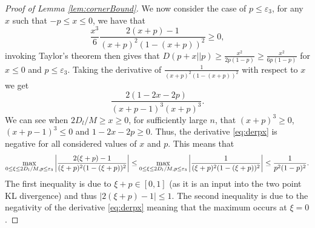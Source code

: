 \documentclass[12pt,reqno]{amsart}
\numberwithin{equation}{section}
\theoremstyle{definition}
\renewcommand{\epsilon}{\varepsilon}
\renewcommand{\[}{\begin{equation}}
\renewcommand{\]}{\end{equation}}
\renewcommand{\|}{\bigg{|}}
\begin{document}
\begin{proof}[Proof of Lemma \ref{lem:cornerBound}]
        We now consider the case of $p \leq \epsilon_3$, for any $x$ such that $-p \leq x \leq 0$, we have that
        \[\frac{x^3}{6}\frac{2(x+p)-1}{(x+p)^2(1-(x+p))^2} \geq 0,\]
        invoking Taylor's theorem then gives that $D(p+x||p) \geq \frac{x^2}{2p(1-p)}  \geq \frac{x^2}{6p(1-p)}$ for $x \leq 0$ and $p \leq \epsilon_3$. Taking the derivative of $\frac{1}{(x+p)^2(1-(x+p))^2}$ with respect to $x$ we get 
        \[\frac{2(1- 2x - 2p)}{(x + p - 1)^3(x + p)^3}.\label{eq:derpx}\]
        We can see when $2D_l/M \geq x \geq 0$, for sufficiently large $n$, that $(x + p)^3 \geq 0$, $(x + p - 1)^3 \leq 0$ and $1-2x-2p \geq 0$. Thus, the derivative \eqref{eq:derpx} is negative for all considered values of $x$ and $p$. This means that
        \[\max_{0 \leq \xi \leq 2D_l/M ,p \leq \epsilon_3}\|\frac{2(\xi+p)-1}{(\xi+p)^2(1-(\xi+p))^2}\| \leq \max_{0 \leq \xi \leq 2D_l/M ,p \leq \epsilon_3}\|\frac{1}{(\xi+p)^2(1-(\xi+p))^2}\| \leq \frac{1}{p^2(1-p)^2}.\]
        The first inequality is due to $\xi + p \in [0,1]$ (as it is an input into the two point KL divergence) and thus $|2(\xi + p) - 1| \leq 1$. The second inequality is due to the negativity of the derivative \eqref{eq:derpx} meaning that the maximum occurs at $\xi = 0$.
    

\end{proof}
\end{document}
